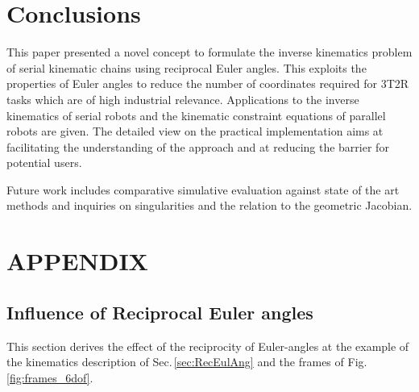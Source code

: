 \documentclass[twocolumn,10pt]{IFTOMM}
\begin{document}
\section{Conclusions}
\label{sec:Conclusion}

This paper presented a novel concept to formulate the inverse kinematics problem of serial kinematic chains using reciprocal Euler angles.
This exploits the properties of Euler angles to reduce the number of coordinates required for 3T2R tasks which are of high industrial relevance.
Applications to the inverse kinematics of serial robots and the kinematic constraint equations of parallel robots are given.
The detailed view on the practical implementation aims at facilitating the understanding of the approach and at reducing the barrier for potential users.

Future work includes comparative simulative evaluation against state of the art methods and inquiries on singularities and the relation to the geometric Jacobian.

\section{APPENDIX}

\subsection{Influence of Reciprocal Euler angles}
\label{sec:appendix_eulerreciproc}

This section derives the effect of the reciprocity of Euler-angles at the example of the kinematics description of Sec.\,\ref{sec:RecEulAng} and the frames of Fig.\,\ref{fig:frames_6dof}.
\end{document}
